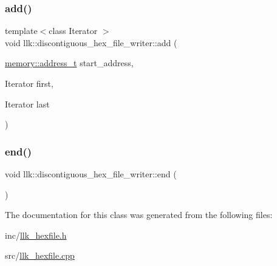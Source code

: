 \subsubsection{\texorpdfstring{add()}{add()}\hspace{0.1cm}{\footnotesize\ttfamily [2/2]}}
{\footnotesize\ttfamily template$<$class Iterator $>$ \\
void llk\+::discontiguous\+\_\+hex\+\_\+file\+\_\+writer\+::add (\begin{DoxyParamCaption}\item[{\hyperlink{classllk_1_1memory_ae7a4b897aa999f22e250dc8e4d773dec}{memory\+::address\+\_\+t}}]{start\+\_\+address,  }\item[{Iterator}]{first,  }\item[{Iterator}]{last }\end{DoxyParamCaption})\hspace{0.3cm}{\ttfamily [inline]}}

\mbox{\label{classllk_1_1discontiguous__hex__file__writer_a7821a63136b422abdc17b8d9efdc1cf9}} 
\subsubsection{\texorpdfstring{end()}{end()}}
{\footnotesize\ttfamily void llk\+::discontiguous\+\_\+hex\+\_\+file\+\_\+writer\+::end (\begin{DoxyParamCaption}{ }\end{DoxyParamCaption})\hspace{0.3cm}{\ttfamily [inline]}}



The documentation for this class was generated from the following files\+:\begin{DoxyCompactItemize}
\item 
inc/\hyperlink{llk__hexfile_8h}{llk\+\_\+hexfile.\+h}\item 
src/\hyperlink{llk__hexfile_8cpp}{llk\+\_\+hexfile.\+cpp}\end{DoxyCompactItemize}
